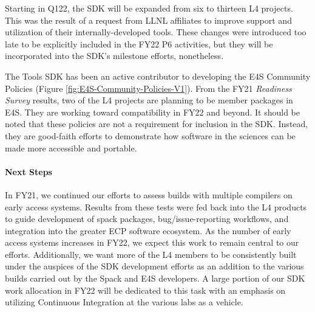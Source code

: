 Starting in Q122, the SDK will be expanded from six to thirteen L4 projects. This was the result of a request from LLNL affiliates to improve support and utilization of their internally-developed tools. These changes were introduced too late to be explicitly included in the FY22 P6 activities, but they will be incorporated into the SDK's milestone efforts, nonetheless.

The Tools SDK has been an active contributor to developing the E4S Community Policies (Figure \ref{fig:E4S-Community-Policies-V1}). From the FY21 \textit{Readiness Survey} results, two of the L4 projects are planning to be member packages in E4S. They are working toward compatibility in FY22 and beyond. It should be noted that these policies are not a requirement for inclusion in the SDK. Instead, they are good-faith efforts to demonstrate how software in the sciences can be made more accessible and portable.

\paragraph{Next Steps}
In FY21, we continued our efforts to assess builds with multiple compilers on early access systems. Results from these tests were fed back into the L4 products to guide development of spack packages, bug/issue-reporting workflows, and integration into the greater ECP software ecosystem. As the number of early access systems increases in FY22, we expect this work to remain central to our efforts. Additionally, we want more of the L4 members to be consistently built under the auspices of the SDK development efforts as an addition to the various builds carried out by the Spack and E4S developers. A large portion of our SDK work allocation in FY22 will be dedicated to this task with an emphasis on utilizing Continuous Integration at the various labs as a vehicle.
